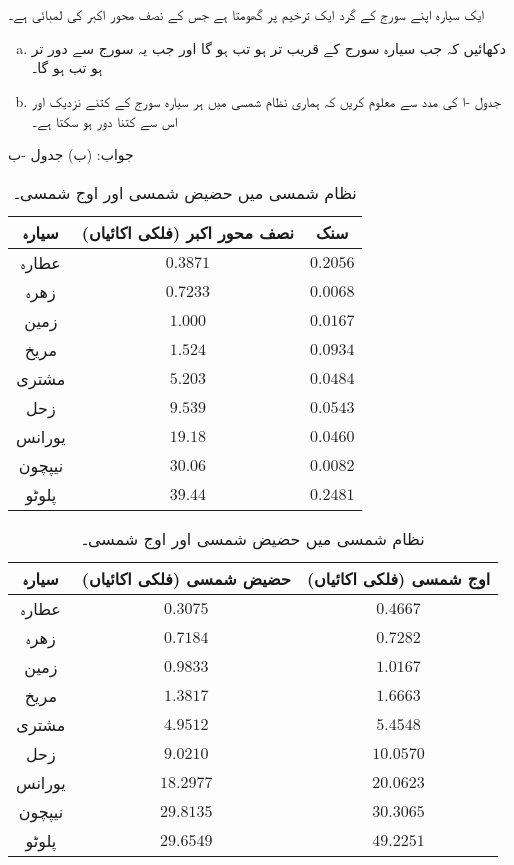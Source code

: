 \\
\\
ایک سیارہ اپنے سورج کے گرد ایک ترخیم پر گھومتا ہے جس کے نصف محور اکبر کی لمبائی  ہے۔
\begin{enumerate}[a.]
\item
دکھائیں کہ جب سیارہ سورج کے قریب تر ہو تب  ہو گا اور جب یہ سورج سے دور تر ہو تب  ہو گا۔
\item
جدول -ا کی مدد سے معلوم کریں کہ ہماری نظام شمسی میں ہر سیارہ سورج کے کتنے نزدیک اور اس سے کتنا دور ہو سکتا ہے۔
\end{enumerate}
جواب:\quad
(ب) جدول -ب
\begin{table}
\caption{نظام شمسی}
\label{جدول_مخروط_نظام_شمسی_تفصیل}
\centering
\begin{subtable}{0.45\textwidth}
\caption{نظام شمسی میں سیاروں کی سنک اور نصف محور اکبر}
\label{جدول_مخروط_نظام_شمسی}
\centering
\begin{tabular}{ccc}
\toprule
سیارہ& نصف محور اکبر (فلکی اکائیاں) & سنک\\
\midrule
عطارہ&$0.3871$& $0.2056$\\
زھرہ&$0.7233$  & $0.0068$\\
زمین& $1.000$  &  $0.0167$\\
مریخ&  $1.524$  &  $0.0934$  \\
مشتری&  $5.203$   &  $0.0484$\\
زحل&  $9.539$  &  $0.0543$\\
یورانس&  $19.18$  &  $0.0460$\\
نیپچون&  $30.06$  &  $0.0082$\\
پلوٹو&  $39.44$   &  $0.2481$\\
\bottomrule
\end{tabular}
\end{subtable}\hfill
\begin{subtable}{0.45\textwidth}
\caption{نظام شمسی میں حضیض شمسی اور اوج شمسی۔}
\label{جدول_مخروط_نظام_شمس_ب}
\centering
\begin{tabular}{ccc}
\toprule
سیارہ& حضیض شمسی (فلکی اکائیاں) & اوج شمسی (فلکی اکائیاں)\\
\midrule
عطارہ&$0.3075$& $0.4667$\\
زھرہ&$0.7184$  & $0.7282$\\
زمین& $0.9833$  &  $1.0167$\\
مریخ&  $1.3817$  &  $1.6663$  \\
مشتری&  $4.9512$   &  $5.4548$\\
زحل&  $9.0210$  &  $10.0570$\\
یورانس&  $18.2977$  &  $20.0623$\\
نیپچون&  $29.8135$  &  $30.3065$\\
پلوٹو&  $29.6549$   &  $49.2251$\\
\bottomrule
\end{tabular}
\end{subtable}
\end{table}


